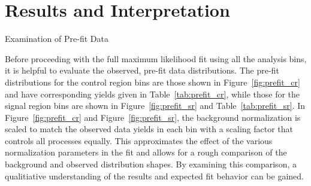 \chapter{Results and Interpretation}

\begin{section}{Examination of Pre-fit Data}
\label{sec:prefit_data}

Before proceeding with the full maximum likelihood fit using all the analysis bins, it is helpful to evaluate the observed, pre-fit data distributions.
The pre-fit \Nb distributions for the control region bins are those shown in Figure~\ref{fig:prefit_cr} and have corresponding yields given in Table~\ref{tab:prefit_cr}, while those for the signal region bins are shown in Figure~\ref{fig:prefit_sr} and Table~\ref{tab:prefit_sr}.
In Figure~\ref{fig:prefit_cr} and Figure~\ref{fig:prefit_sr}, the background normalization is scaled to match the observed data yields in each bin with a scaling factor that controls all processes equally.
This approximates the effect of the various normalization parameters in the fit and allows for a rough comparison of the background and observed \Nb distribution shapes.
By examining this comparison, a qualitiative understanding of the results and expected fit behavior can be gained.


\end{section}
